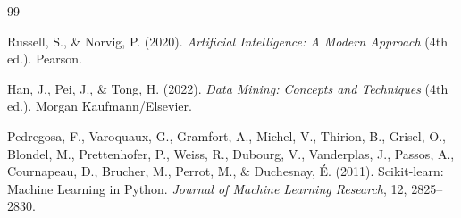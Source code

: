 \documentclass[a4paper,oneside,12pt]{report}
\begin{document}
\begin{thebibliography}{99}

Russell, S., \& Norvig, P. (2020). \textit{Artificial Intelligence: A Modern Approach} (4th ed.). Pearson.

Han, J., Pei, J., \& Tong, H. (2022). \textit{Data Mining: Concepts and Techniques} (4th ed.). Morgan Kaufmann/Elsevier.

Pedregosa, F., Varoquaux, G., Gramfort, A., Michel, V., Thirion, B., Grisel, O., Blondel, M., Prettenhofer, P., Weiss, R., Dubourg, V., Vanderplas, J., Passos, A., Cournapeau, D., Brucher, M., Perrot, M., \& Duchesnay, \'E. (2011). Scikit-learn: Machine Learning in Python. \textit{Journal of Machine Learning Research}, 12, 2825--2830.

\end{thebibliography}
\end{document}
